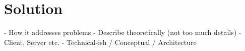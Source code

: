 
\chapter{Solution} \label{solution}



- How it addresses problems
- Describe theoretically (not too much details)
- Client, Server etc.
- Technical-ish / Conceptual / Architecture 